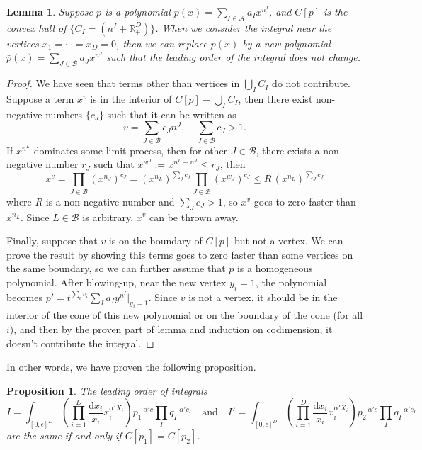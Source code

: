 \documentclass[12pt]{article}
\theoremstyle{definition}
\theoremstyle{plain}
\newtheorem{lem}[para]{Lemma}
\newtheorem{pro}[para]{Proposition}
\newcommand{\dif}{\mathrm{d}} %
\begin{document}
\begin{lem}
Suppose $p$ is a polynomial $p(x)=\sum_{I\in \mathscr A}a_I x^{n^I}$, and $C[p]$ is the convex hull
of $\{C_{I}=(n^I+\mathbb R^D_{+})\}$. When we consider the integral near the vertices $x_1=\cdots=x_D=0$, 
then we can replace $p(x)$ by a new polynomial $\bar p(x)=\sum_{J\in \mathscr B}a_J x^{n^J}$ such that
the leading order of the integral does not change.
\end{lem}


\begin{proof}
We have seen that terms other than vertices in $\bigcup_I C_I$ do not contribute. Suppose a term $x^v$ 
is in the interior of $C[p]-\bigcup_I C_I$,  
then there exist non-negative numbers $\{c_J\}$ such that it can be written as 
\[
	v = \sum_{J\in \mathscr B}c_J n^J,\quad \sum_{J\in \mathscr B} c_J>1.
\]
If $x^{n^L}$ dominates some limit process, 
then for other $J\in \mathscr B$, there exists a non-negative number $r_J$ such that
$x^{w^J}:=x^{n^L-n^J}\leq r_J$, then 
\[
	x^v = \prod_{J\in\mathscr B} (x^{n_J})^{c_J} = 
	(x^{n_L})^{\sum_J c_J}\prod_{J\in \mathscr B} 
	(x^{w_J})^{c_J}\leq R\,(x^{n_L})^{\sum_J c_J}
\] 
where $R$ is a non-negative number and $\sum_J c_J>1$, so $x^v$ goes to 
zero faster than $x^{n_L}$. Since $L\in \mathscr B$ is arbitrary, $x^v$ can be thrown away.

Finally, suppose that $v$ is on the boundary of $C[p]$ but not a vertex.
We can prove the result by showing this terms goes to zero faster than some vertices on the 
same boundary, so we can further assume that $p$ is a homogeneous polynomial.
After blowing-up, near the new vertex
$y_i=1$, the polynomial becomes $p'=t^{\sum_i v_i}\sum_{I}a_I y^{n^I}|_{y_i=1}$. 
Since $v$ is not a vertex, it should be in the interior of the cone of this new polynomial or 
on the boundary of the cone (for all $i$), and then by 
the proven part of lemma and induction on codimension, it doesn't contribute the integral.
\end{proof}

In other words, we have proven the following proposition. 

\begin{pro}
The leading order of integrals
\[
	I=\int_{[0,\epsilon]^D} \left(\prod_{i=1}^D\frac{\dif x_i}{x_i}x_i^{\alpha' X_i}\right)
	p_1^{-\alpha' c} \prod_I q_I^{-\alpha' c_I}
	\quad \text{and} \quad 
	I'=\int_{[0,\epsilon]^D} \left(\prod_{i=1}^D\frac{\dif x_i}{x_i}x_i^{\alpha' X_i}\right)
	p_2^{-\alpha' c} \prod_I q_I^{-\alpha' c_I}
\]
are the same if and only if $C[p_1]=C[p_2]$.
\end{pro}
\end{document}
